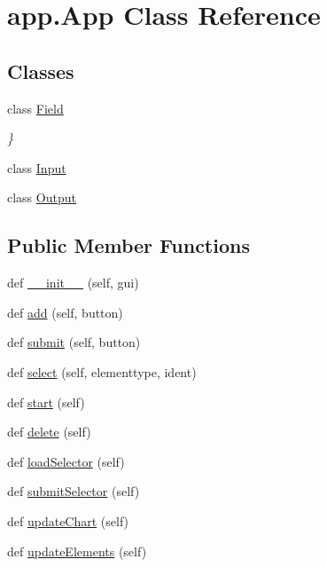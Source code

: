 \hypertarget{classapp_1_1_app}{}\section{app.\+App Class Reference}
\label{classapp_1_1_app}
\subsection*{Classes}
\begin{DoxyCompactItemize}
\item 
class \hyperlink{classapp_1_1_app_1_1_field}{Field}
\begin{DoxyCompactList}\small\item\em \} \end{DoxyCompactList}\item 
class \hyperlink{classapp_1_1_app_1_1_input}{Input}
\item 
class \hyperlink{classapp_1_1_app_1_1_output}{Output}
\end{DoxyCompactItemize}
\subsection*{Public Member Functions}
\begin{DoxyCompactItemize}
\item 
def \hyperlink{group___g_u_i_ga7ebfdd74ff42ca9b5c1dd6383b4641f8}{\+\_\+\+\_\+init\+\_\+\+\_\+} (self, gui)
\item 
def \hyperlink{group___g_u_i_ga12410afa08ea83e0e75958316f3bfa44}{add} (self, button)
\item 
def \hyperlink{group___g_u_i_ga5fa0636a03dcc38bf7bcf219d27167ca}{submit} (self, button)
\item 
def \hyperlink{group___g_u_i_gaa1a0515399dab21f9b6e5c075f549312}{select} (self, elementtype, ident)
\item 
def \hyperlink{group___g_u_i_ga9e6225026b8708f880e1f4679ca94eec}{start} (self)
\item 
def \hyperlink{group___g_u_i_ga11694b61d1b324b5628ca9b110990451}{delete} (self)
\item 
def \hyperlink{group___g_u_i_gaeee64598c3249a2d0bb2bcae96a5372e}{load\+Selector} (self)
\item 
def \hyperlink{group___g_u_i_gae9b8c9daf8c301d4ff545148989984b3}{submit\+Selector} (self)
\item 
def \hyperlink{group___g_u_i_ga8f0a02d26fd64277f30a700190bdc9f2}{update\+Chart} (self)
\item 
def \hyperlink{group___g_u_i_ga9ff44df3681a65aeaf309207a69c17bb}{update\+Elements} (self)
\end{DoxyCompactItemize}
